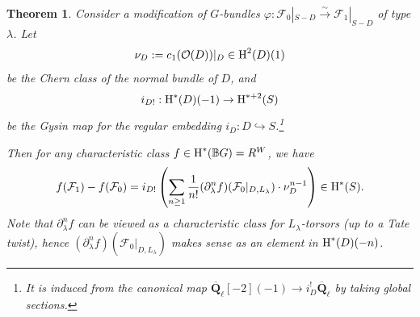 \documentclass[reqno]{amsart}
\numberwithin{equation}{subsection}
\newtheorem{theorem}[subsubsection]{Theorem}
\theoremstyle{definition}
\newtheorem{remark}[subsubsection]{Remark}
\newcommand{\TF}[1]{{\color{ForestGreen}{#1}}}
\def\BB{\mathbb{B}}
\newcommand\cF{\mathcal{F}}
\newcommand\cO{\mathcal{O}}
\newcommand{\Qlbar}{\overline{\Q}_\ell}
\newcommand{\cohog}[2]{\textup{H}^{#1}({#2})}     %
\newcommand{\incl}{\hookrightarrow}
\newcommand{\isom}{\stackrel{\sim}{\to}}
\newcommand{\ph}{\varphi}
\renewcommand{\l}{\lambda}
\newcommand\Yun[1]{{\color{red} Y:#1}}
\newcommand\pl{\partial}
\newcommand\mnote[1]{\marginpar{\tiny #1}}
\newcommand{\Q}{\mathbf{Q}}
\begin{document}
\begin{theorem}\label{th:master gen} Consider a modification of $G$-bundles 
$\ph: \cF_{0}|_{S-D}\isom \cF_{1}|_{S-D}$
of type $\l$. Let 
\[
\nu_{D}:=c_{1}(\cO(D))|_{D}\in \cohog{2}{D}(1)
\]
be the Chern class of the normal bundle of $D$, and 
\[
i_{D!}: \cohog{*}{D}(-1)\to \cohog{*+2}{S}
\]
be the Gysin map for the regular embedding $i_{D}: D\incl S$.\footnote{It is induced from the canonical map $\Qlbar[-2](-1)\to i^{!}_{D}\Qlbar$ by taking global sections.} 

Then for any characteristic class $f\in \cohog{*}{\BB G}=R^{W}$, we have %
\begin{equation}\label{diff char classes}
f(\cF_{1})-f(\cF_{0})=i_{D!}\left(\sum_{n\ge1}\frac{1}{n!}(\pl^{n}_{\l}f)(\cF_{0}|_{D, L_{\l}})\cdot \nu_{D}^{n-1}\right)\in \cohog{*}{S}.
\end{equation}
Note that $\pl^{n}_{\l}f$ can be viewed as a characteristic class for $L_{\l}$-torsors (up to a Tate twist), hence $(\pl^{n}_{\l}f)(\cF_{0}|_{D, L_{\l}})$ makes sense as an element in $\cohog{*}{D}(-n)$.
\end{theorem} 

\end{document}
